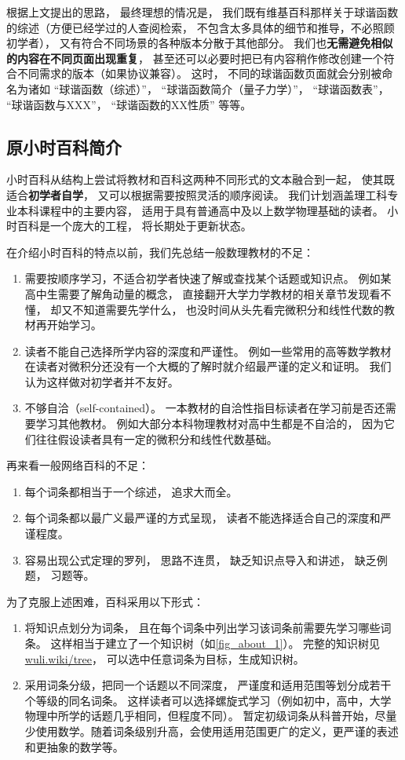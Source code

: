 根据上文提出的思路， 最终理想的情况是， 我们既有维基百科那样关于球谐函数的综述（方便已经学过的人查阅检索， 不包含太多具体的细节和推导，不必照顾初学者）， 又有符合不同场景的各种版本分散于其他部分。 我们也\textbf{无需避免相似的内容在不同页面出现重复}， 甚至还可以必要时把已有内容稍作修改创建一个符合不同需求的版本（如果协议兼容）。 这时， 不同的球谐函数页面就会分别被命名为诸如 “球谐函数（综述）”， “球谐函数简介（量子力学）”， “球谐函数表”， “球谐函数与XXX”， “球谐函数的XX性质” 等等。

\subsection{原小时百科简介}\label{sub_about_1}

小时百科从结构上尝试将教材和百科这两种不同形式的文本融合到一起， 使其既适合\textbf{初学者自学}， 又可以根据需要按照灵活的顺序阅读。 我们计划涵盖理工科专业本科课程中的主要内容， 适用于具有普通高中及以上数学物理基础的读者。 小时百科是一个庞大的工程， 将长期处于更新状态。

在介绍小时百科的特点以前，我们先总结一般数理教材的不足：
\begin{enumerate}
\item 需要按顺序学习，不适合初学者快速了解或查找某个话题或知识点。 例如某高中生需要了解角动量的概念， 直接翻开大学力学教材的相关章节发现看不懂， 却又不知道需要先学什么， 也没时间从头先看完微积分和线性代数的教材再开始学习。
\item 读者不能自己选择所学内容的深度和严谨性。 例如一些常用的高等数学教材在读者对微积分还没有一个大概的了解时就介绍最严谨的定义和证明。 我们认为这样做对初学者并不友好。
\item 不够自洽（self-contained）。 一本教材的自洽性指目标读者在学习前是否还需要学习其他教材。 例如大部分本科物理教材对高中生都是不自洽的， 因为它们往往假设读者具有一定的微积分和线性代数基础。
\end{enumerate}

再来看一般网络百科的不足：
\begin{enumerate}
\item 每个词条都相当于一个综述， 追求大而全。
\item 每个词条都以最广义最严谨的方式呈现， 读者不能选择适合自己的深度和严谨程度。
\item 容易出现公式定理的罗列， 思路不连贯， 缺乏知识点导入和讲述， 缺乏例题， 习题等。
\end{enumerate}

为了克服上述困难，百科采用以下形式：
\begin{enumerate}
\item 将知识点划分为词条， 且在每个词条中列出学习该词条前需要先学习哪些词条。 这样相当于建立了一个知识树（如\autoref{fig_about_1}）。 完整的知识树见 \href{https://wuli.wiki/tree}{wuli.wiki/tree}， 可以选中任意词条为目标，生成知识树。
\item 采用词条分级，把同一个话题以不同深度， 严谨度和适用范围等划分成若干个等级的同名词条。 这样读者可以选择螺旋式学习（例如初中，高中，大学物理中所学的话题几乎相同，但程度不同）。 暂定初级词条从科普开始，尽量少使用数学。随着词条级别升高，会使用适用范围更广的定义，更严谨的表述和更抽象的数学等。
\end{enumerate}

